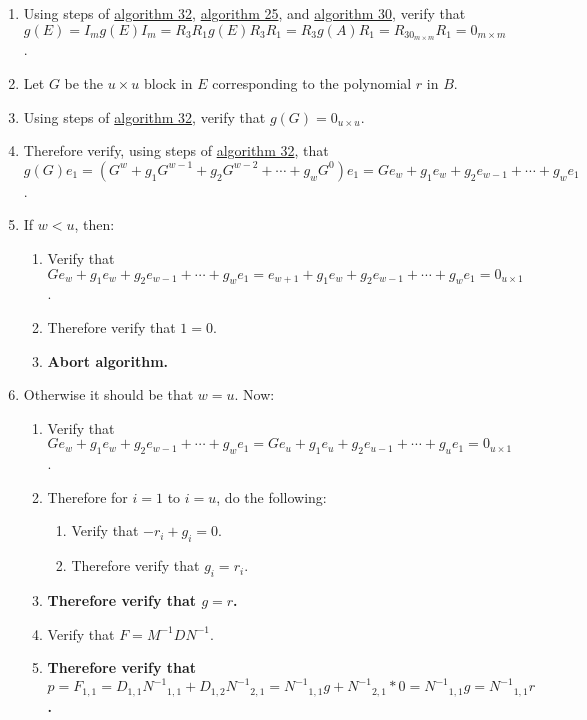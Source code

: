 \documentclass[twocolumn]{article}
\begin{document}
\begin{enumerate}
				\item Using steps of \hyperref[sec:algorithm 32]{algorithm 32}, \hyperref[sec:algorithm 25]{algorithm 25}, and \hyperref[sec:algorithm 30]{algorithm 30}, verify that $g(E)=I_mg(E)I_m=R_3R_1g(E)R_3R_1=R_3g(A)R_1=R_30_{m\times m}R_1=0_{m\times m}$.
				\item Let $G$ be the $u\times u$ block in $E$ corresponding to the polynomial $r$ in $B$.
				\item Using steps of \hyperref[sec:algorithm 32]{algorithm 32}, verify that $g(G)=0_{u\times u}$.
				\item Therefore verify, using steps of \hyperref[sec:algorithm 32]{algorithm 32}, that $g(G)e_1=(G^w+g_1G^{w-1}+g_2G^{w-2}+\cdots+g_wG^0)e_1=Ge_w+g_1e_w+g_2e_{w-1}+\cdots+g_we_1$.
				\item If $w<u$, then:
				\begin{enumerate}
					\item Verify that $Ge_w+g_1e_w+g_2e_{w-1}+\cdots+g_we_1=e_{w+1}+g_1e_w+g_2e_{w-1}+\cdots+g_we_1=0_{u\times 1}$.
					\item Therefore verify that $1=0$.
					\item \textbf{Abort algorithm.}
				\end{enumerate}
				\item Otherwise it should be that $w=u$. Now:
				\begin{enumerate}
					\item Verify that $Ge_w+g_1e_w+g_2e_{w-1}+\cdots+g_we_1=Ge_u+g_1e_u+g_2e_{u-1}+\cdots+g_ue_1=0_{u\times 1}$.
					\item Therefore for $i=1$ to $i=u$, do the following:
					\begin{enumerate}
						\item Verify that $-r_i+g_i=0$.
						\item Therefore verify that $g_i=r_i$.
					\end{enumerate}
					\item \textbf{Therefore verify that $g=r$.}
					\item Verify that $F=M^{-1}DN^{-1}$.
					\item \textbf{Therefore verify that $p=F_{1,1}=D_{1,1}{N^{-1}}_{1,1}+D_{1,2}{N^{-1}}_{2,1}={N^{-1}}_{1,1}g+{N^{-1}}_{2,1}*0={N^{-1}}_{1,1}g={N^{-1}}_{1,1}r$.}
				\end{enumerate}
			\end{enumerate}
\end{document}
